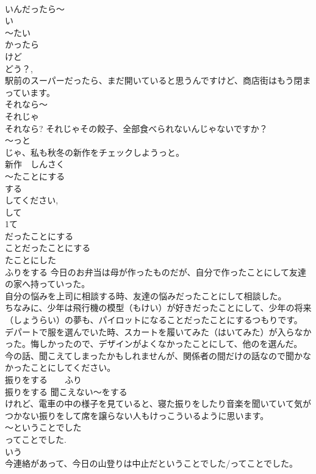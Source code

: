 \documentclass[8pt]{extreport}
\begin{document}
\begin{CJK}{UTF8}{min}
\\	いんだったら～ 
\\	い
\\	～たい 
\\	かったら 
\\	けど 
\\	どう？, 
\\	駅前のスーパーだったら、まだ開いていると思うんですけど、商店街はもう閉まっています。 
\\	それなら～ 
\\	それじゃ 
\\	それなら? それじゃその餃子、全部食べられないんじゃないですか？ 
\\	～っと	
\\	じゃ、私も秋冬の新作をチェックしようっと。 
\\	新作　しんさく 
\\	～たことにする	
\\	する 
\\	してください, 
\\	して 
\\	1て
\\	だったことにする 
\\	ことだったことにする 
\\	たことにした 
\\	ふりをする 今日のお弁当は母が作ったものだが、自分で作ったことにして友達の家へ持っていった。 
\\	自分の悩みを上司に相談する時、友達の悩みだったことにして相談した。 
\\	ちなみに、少年は飛行機の模型（もけい）が好きだったことにして、少年の将来（しょうらい）の夢も、パイロットになることだったことにするつもりです。 デパートで服を選んでいた時、スカートを履いてみた（はいてみた）が入らなかった。悔しかったので、デザインがよくなかったことにして、他のを選んだ。 
\\	今の話、聞こえてしまったかもしれませんが、関係者の間だけの話なので聞かなかったことにしてください。 
\\	振りをする　　ふり 
\\	振りをする 聞こえない～をする　
\\	けれど、電車の中の様子を見ていると、寝た振りをしたり音楽を聞いていて気がつかない振りをして席を譲らない人もけっこういるように思います。
\\	～ということでした	
\\	ってことでした. 
\\	いう 
\\	今連絡があって、今日の山登りは中止だということでした/ってことでした。 

\end{CJK}
\end{document}
